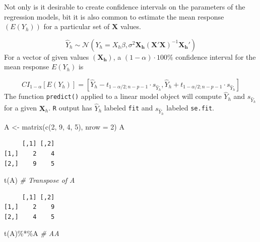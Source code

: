 \documentclass[
]{article}
\newenvironment{Shaded}{\begin{snugshade}}{\end{snugshade}}
\newcommand{\AttributeTok}[1]{\textcolor[rgb]{0.77,0.63,0.00}{#1}}
\newcommand{\CommentTok}[1]{\textcolor[rgb]{0.56,0.35,0.01}{\textit{#1}}}
\newcommand{\DecValTok}[1]{\textcolor[rgb]{0.00,0.00,0.81}{#1}}
\newcommand{\FunctionTok}[1]{\textcolor[rgb]{0.00,0.00,0.00}{#1}}
\newcommand{\NormalTok}[1]{#1}
\newcommand{\OtherTok}[1]{\textcolor[rgb]{0.56,0.35,0.01}{#1}}
\newcommand{\SpecialCharTok}[1]{\textcolor[rgb]{0.00,0.00,0.00}{#1}}
\begin{document}
Not only is it desirable to create confidence intervals on the parameters of the regression models, bit it is also common to estimate the mean response \(\left(E(Y_h)\right)\) for a particular set of \(\mathbf{X}\) values.

\[\hat{Y}_h \sim \mathcal{N}(Y_h = X_h\beta, \sigma^2\mathbf{X_h}(\mathbf{X'X})^{-1}\mathbf{X_h'})\]
For a vector of given values \((\mathbf{X_h})\), a \((1 - \alpha)\cdot 100\%\) confidence interval for the mean response \(E(Y_h)\) is

\[CI_{1-\alpha}\left[E(Y_h)\right] = \left[\hat{Y}_h - t_{1 - \alpha/2;n - p - 1}\cdot s_{\hat{Y}_h}, \hat{Y}_h + t_{1 - \alpha/2;n - p - 1}\cdot s_{\hat{Y}_h}  \right]\]
The function \texttt{predict()} applied to a linear model object will compute \(\hat{Y}_h\) and \(s_{\hat{Y}_h}\) for a given \(\mathbf{X}_h\). \texttt{R} output has \(\hat{Y}_h\) labeled \texttt{fit} and \(s_{\hat{Y}_h}\) labeled \texttt{se.fit}.

\begin{Shaded}
\begin{Highlighting}[]
\NormalTok{A }\OtherTok{\textless{}{-}} \FunctionTok{matrix}\NormalTok{(}\FunctionTok{c}\NormalTok{(}\DecValTok{2}\NormalTok{, }\DecValTok{9}\NormalTok{, }\DecValTok{4}\NormalTok{, }\DecValTok{5}\NormalTok{), }\AttributeTok{nrow =} \DecValTok{2}\NormalTok{)}
\NormalTok{A}
\end{Highlighting}
\end{Shaded}

\begin{verbatim}
     [,1] [,2]
[1,]    2    4
[2,]    9    5
\end{verbatim}

\begin{Shaded}
\begin{Highlighting}[]
\FunctionTok{t}\NormalTok{(A)          }\CommentTok{\# Transpose of A}
\end{Highlighting}
\end{Shaded}

\begin{verbatim}
     [,1] [,2]
[1,]    2    9
[2,]    4    5
\end{verbatim}

\begin{Shaded}
\begin{Highlighting}[]
\FunctionTok{t}\NormalTok{(A)}\SpecialCharTok{\%*\%}\NormalTok{A      }\CommentTok{\# A\textquotesingle{}A}
\end{Highlighting}
\end{Shaded}
\end{document}
